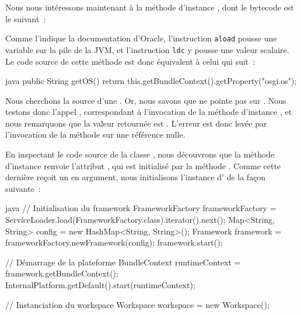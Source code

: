 Nous nous intéressons maintenant à la méthode d'instance , dont le bytecode est le suivant~:


Comme l'indique la documentation d'Oracle, l'instruction \texttt{aload} \cite{javaaload} pousse une variable sur la pile de la JVM, et l'instruction %
\texttt{ldc} \cite{javaldc} y pousse une valeur scalaire.
Le code source de cette méthode est donc équivalent à celui qui suit~:

\begin{imtaCode}{java}
public String getOS() {
    return this.getBundleContext().getProperty("osgi.os");
}
\end{imtaCode}

Nous cherchons la source d'une .
Or, nous savons que  ne pointe pas sur .
Nous testons donc l'appel , correspondant à l'invocation de la méthode d'instance %
, et nous remarquons que la valeur retournée est .
L'erreur  est donc levée par l'invocation de la méthode  sur une référence nulle.

En inspectant le code source de la classe , nous découvrons que la méthode d'instance  renvoie l'attribut , %
qui est initialisé par la méthode .
Comme cette dernière reçoit un  en argument, nous initialisons l'instance d' de la façon suivante~:

\begin{imtaCode}{java}
// Initialisation du framework
FrameworkFactory frameworkFactory = ServiceLoader.load(FrameworkFactory.class).iterator().next();
Map<String, String> config = new HashMap<String, String>();
Framework framework = frameworkFactory.newFramework(config);
framework.start();

// Démarrage de la plateforme
BundleContext runtimeContext = framework.getBundleContext();
InternalPlatform.getDefault().start(runtimeContext);

// Instanciation du workspace
Workspace workspace = new Workspace();
\end{imtaCode}

